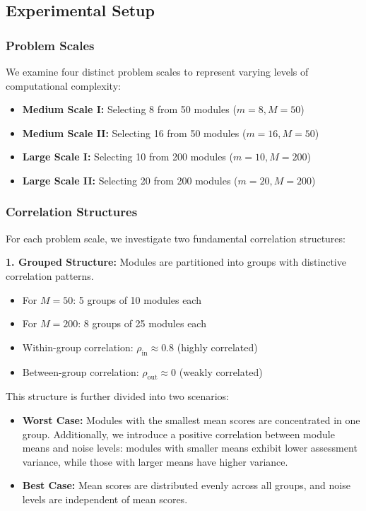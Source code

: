 \documentclass[opre,sglanonrev]{informs4}
\begin{document}
\subsection{Experimental Setup}
\label{sec:exp_setup}

\subsubsection{Problem Scales}
We examine four distinct problem scales to represent varying levels of computational complexity:
\begin{itemize}
    \item \textbf{Medium Scale I:} Selecting 8 from 50 modules ($m=8, M=50$)
    \item \textbf{Medium Scale II:} Selecting 16 from 50 modules ($m=16, M=50$)
    \item \textbf{Large Scale I:} Selecting 10 from 200 modules ($m=10, M=200$)
    \item \textbf{Large Scale II:} Selecting 20 from 200 modules ($m=20, M=200$)
\end{itemize}

\subsubsection{Correlation Structures}
For each problem scale, we investigate two fundamental correlation structures:

\textbf{1. Grouped Structure:} Modules are partitioned into groups with distinctive correlation patterns.
\begin{itemize}
    \item For $M=50$: 5 groups of 10 modules each
    \item For $M=200$: 8 groups of 25 modules each
    \item Within-group correlation: $\rho_{\text{in}} \approx 0.8$ (highly correlated)
    \item Between-group correlation: $\rho_{\text{out}} \approx 0$ (weakly correlated)
\end{itemize}

This structure is further divided into two scenarios:
\begin{itemize}
    \item \textbf{Worst Case:} Modules with the smallest mean scores are concentrated in one group. Additionally, we introduce a positive correlation between module means and noise levels: modules with smaller means exhibit lower assessment variance, while those with larger means have higher variance.
    \item \textbf{Best Case:} Mean scores are distributed evenly across all groups, and noise levels are independent of mean scores.
\end{itemize}
\end{document}
